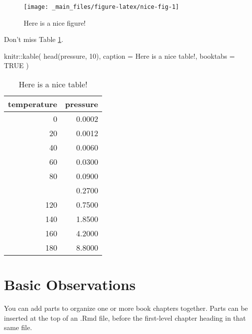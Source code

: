 \documentclass[
]{book}
\newenvironment{Shaded}{\begin{snugshade}}{\end{snugshade}}
\newcommand{\AttributeTok}[1]{\textcolor[rgb]{0.77,0.63,0.00}{#1}}
\newcommand{\ConstantTok}[1]{\textcolor[rgb]{0.00,0.00,0.00}{#1}}
\newcommand{\DecValTok}[1]{\textcolor[rgb]{0.00,0.00,0.81}{#1}}
\newcommand{\FunctionTok}[1]{\textcolor[rgb]{0.00,0.00,0.00}{#1}}
\newcommand{\NormalTok}[1]{#1}
\newcommand{\SpecialCharTok}[1]{\textcolor[rgb]{0.00,0.00,0.00}{#1}}
\newcommand{\StringTok}[1]{\textcolor[rgb]{0.31,0.60,0.02}{#1}}
\begin{document}
\begin{figure}

{\centering \texttt{[image: \_main\_files/figure-latex/nice-fig-1]} 

}

\caption{Here is a nice figure!}\label{fig:nice-fig}
\end{figure}

Don't miss Table \ref{tab:nice-tab}.

\begin{Shaded}
\begin{Highlighting}[]
\NormalTok{knitr}\SpecialCharTok{::}\FunctionTok{kable}\NormalTok{(}
  \FunctionTok{head}\NormalTok{(pressure, }\DecValTok{10}\NormalTok{), }\AttributeTok{caption =} \StringTok{\textquotesingle{}Here is a nice table!\textquotesingle{}}\NormalTok{,}
  \AttributeTok{booktabs =} \ConstantTok{TRUE}
\NormalTok{)}
\end{Highlighting}
\end{Shaded}

\begin{table}

\caption{\label{tab:nice-tab}Here is a nice table!}
\centering
\begin{tabular}[t]{rr}
\toprule
temperature & pressure\\
\midrule
0 & 0.0002\\
20 & 0.0012\\
40 & 0.0060\\
60 & 0.0300\\
80 & 0.0900\\
\addlinespace
100 & 0.2700\\
120 & 0.7500\\
140 & 1.8500\\
160 & 4.2000\\
180 & 8.8000\\
\bottomrule
\end{tabular}
\end{table}

\hypertarget{basic-observations}{%
\chapter{Basic Observations}\label{basic-observations}}

You can add parts to organize one or more book chapters together. Parts can be inserted at the top of an .Rmd file, before the first-level chapter heading in that same file.
\end{document}

